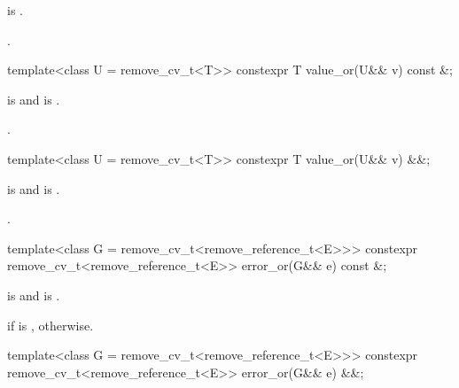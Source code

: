 \begin{itemdescr}
\pnum
\hardexpects
{} is .

\pnum
\returns
{}.
\end{itemdescr}

%
\begin{itemdecl}
template<class U = remove_cv_t<T>> constexpr T value_or(U&& v) const &;
\end{itemdecl}

\begin{itemdescr}
\pnum
\mandates
{} is  and
 is .

\pnum
\returns
{}.
\end{itemdescr}

%
\begin{itemdecl}
template<class U = remove_cv_t<T>> constexpr T value_or(U&& v) &&;
\end{itemdecl}

\begin{itemdescr}
\pnum
\mandates
{} is  and
 is .

\pnum
\returns
{}.
\end{itemdescr}

%
\begin{itemdecl}
template<class G = remove_cv_t<remove_reference_t<E>>>
  constexpr remove_cv_t<remove_reference_t<E>> error_or(G&& e) const &;
\end{itemdecl}

\begin{itemdescr}
\pnum
\mandates
{} is
 and
 is
.

\pnum
\returns
{} if  is ,
 otherwise.
\end{itemdescr}

%
\begin{itemdecl}
template<class G = remove_cv_t<remove_reference_t<E>>>
  constexpr remove_cv_t<remove_reference_t<E>> error_or(G&& e) &&;
\end{itemdecl}

